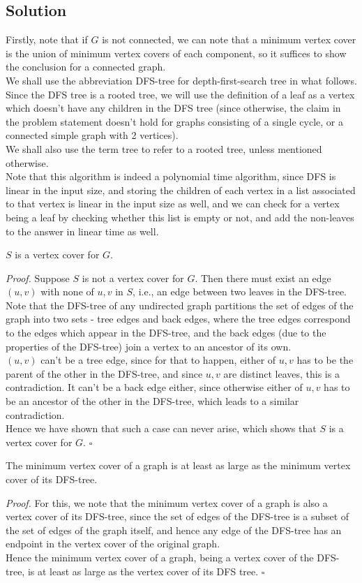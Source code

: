 \documentclass[a4paper]{article}
\newenvironment{proof}{\begin{breakbox}\textit{Proof.}}{\hfill$\square$\end{breakbox}}
\newcommand{\nl}{\vspace{0.2cm}\\}
\begin{document}
\subsection{Solution}
Firstly, note that if $G$ is not connected, we can note that a minimum vertex cover is the union of minimum vertex covers of each component, so it suffices to show the conclusion for a
connected graph.\nl
We shall use the abbreviation DFS-tree for depth-first-search tree in what follows.\nl
Since the DFS tree is a rooted tree, we will use the definition of a leaf as a vertex which doesn't have any children in the DFS tree (since otherwise, the claim in the problem statement doesn't
hold for graphs consisting of a single cycle, or a connected simple graph with 2 vertices).\nl
We shall also use the term tree to refer to a rooted tree, unless mentioned otherwise.\nl
Note that this algorithm is indeed a polynomial time algorithm, since DFS is linear in the input size, and storing the children of each vertex in a list associated to that vertex is linear in the
input size as well, and we can check for a vertex being a leaf by checking whether this list is empty or not, and add the non-leaves to the answer in linear time as well.\nl
\begin{claim}
    $S$ is a vertex cover for $G$.
\end{claim}
\begin{proof}
    Suppose $S$ is not a vertex cover for $G$. Then there must exist an edge $(u, v)$ with none of $u, v$ in $S$, i.e., an edge between two leaves in the DFS-tree.\nl
    Note that the DFS-tree of any undirected graph partitions the set of edges of the graph into two sets - tree edges and back edges, where the tree edges correspond to the edges which appear in
    the DFS-tree, and the back edges (due to the properties of the DFS-tree) join a vertex to an ancestor of its own.\nl
    $(u, v)$ can't be a tree edge, since for that to happen, either of $u, v$ has to be the parent of the other in the DFS-tree, and since $u, v$ are distinct leaves, this is a contradiction. It can't be a back edge
    either, since otherwise either of $u, v$ has to be an ancestor of the other in the DFS-tree, which leads to a similar contradiction.\nl
    Hence we have shown that such a case can never arise, which shows that $S$ is a vertex cover for $G$.
\end{proof}
\begin{claim}
    The minimum vertex cover of a graph is at least as large as the minimum vertex cover of its DFS-tree.
\end{claim}
\begin{proof}
    For this, we note that the minimum vertex cover of a graph is also a vertex cover of its DFS-tree, since the set of edges of the DFS-tree is a subset of the set of edges of the graph itself, and
    hence any edge of the DFS-tree has an endpoint in the vertex cover of the original graph.\nl
    Hence the minimum vertex cover of a graph, being a vertex cover of the DFS-tree, is at least as large as the vertex cover of its DFS tree.
\end{proof}
\end{document}
